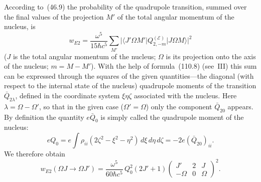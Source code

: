 According to~(46.9) the probability of the quadrupole transition, summed over the final values of the projection $M'$ of the total angular momentum of the nucleus, is
\[
w_{E2} = \frac{\omega^5}{15\hbar c^5}\sum_{M'}|\langle J'\Omega M'|Q^{(\mathscr{E})}_{2,-m}|J\Omega M\rangle|^2
\]
($J$ is the total angular momentum of the nucleus; $\Omega$ is its projection onto the axis of the nucleus; $m = M - M'$). With the help of formula~(110.8) (see~III) this sum can be expressed through the squares of the given quantities---the diagonal (with respect to the internal state of the nucleus) quadrupole moments of the transition $\bar{Q}_{2\lambda}$, defined in the coordinate system $\xi\eta\zeta$ associated with the nucleus. Here $\lambda = \Omega - \Omega'$, so that in the given case ($\Omega' = \Omega$) only the component $\bar{Q}_{20}$ appears. By definition the quantity $e\bar{Q}_0$ is simply called the quadrupole moment of the nucleus:
\[
eQ_0 = e\int\rho_{ii}(2\zeta^2 - \xi^2 - \eta^2)\,d\xi\,d\eta\,d\zeta = -2e(\bar{Q}_{20})_{ii}.
\]
We therefore obtain
\begin{equation}
w_{E2}(\Omega J \to \Omega J') = \frac{\omega^5}{60\hbar c^5}\,Q^2_0(2J'+1)\begin{pmatrix} J' & 2 & J \\ -\Omega & 0 & \Omega\end{pmatrix}^{\!2}.
\tag{55.3}
\end{equation}

